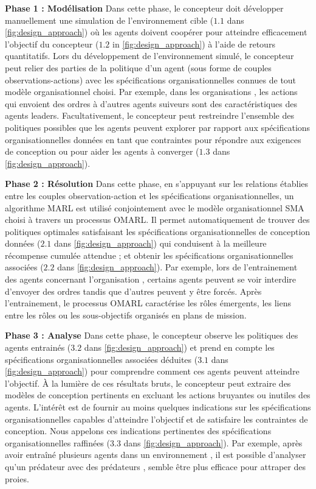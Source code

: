 \documentclass[contribution]{jfsma}
\newcounter{relation}
\begin{document}
\textbf{Phase 1 : Modélisation} \quad Dans cette phase, le concepteur doit développer manuellement une simulation de l'environnement cible ($1.1$ dans \autoref{fig:design_approach}) où les agents doivent coopérer pour atteindre efficacement l'objectif du concepteur ($1.2 $ in \autoref{fig:design_approach}) à l'aide de retours quantitatifs. Lors du développement de l'environnement simulé, le concepteur peut relier des parties de la politique d'un agent (sous forme de couples observations-actions) avec les spécifications organisationnelles connues de tout modèle organisationnel choisi.
Par exemple, dans les organisations , les actions qui envoient des ordres à d'autres agents suiveurs sont des caractéristiques des agents leaders.
Facultativement, le concepteur peut restreindre l'ensemble des politiques possibles que les agents peuvent explorer par rapport aux spécifications organisationnelles données en tant que contraintes pour répondre aux exigences de conception ou pour aider les agents à converger ($1.3$ dans \autoref{fig:design_approach}).

\textbf{Phase 2 : Résolution} \quad Dans cette phase, en s'appuyant sur les relations établies entre les couples observation-action et les spécifications organisationnelles, un algorithme MARL est utilisé conjointement avec le modèle organisationnel SMA choisi à travers un processus OMARL. Il permet automatiquement de trouver des politiques optimales satisfaisant les spécifications organisationnelles de conception données ($2.1$ dans \autoref{fig:design_approach}) qui conduisent à la meilleure récompense cumulée attendue ; et obtenir les spécifications organisationnelles associées ($2.2$ dans \autoref{fig:design_approach}). Par exemple, lors de l'entrainement des agents concernant l'organisation , certains agents peuvent se voir interdire d'envoyer des ordres tandis que d'autres peuvent y être forcés. Après l'entrainement, le processus OMARL caractérise les rôles émergents, les liens entre les rôles ou les sous-objectifs organisés en plans de mission.

\textbf{Phase 3 : Analyse} \quad Dans cette phase, le concepteur observe les politiques des agents entrainés ($3.2$ dans \autoref{fig:design_approach}) et prend en compte les spécifications organisationnelles associées déduites ($3.1$ dans \autoref{fig:design_approach}) pour comprendre comment ces agents peuvent atteindre l'objectif. À la lumière de ces résultats bruts, le concepteur peut extraire des modèles de conception pertinents en excluant les actions bruyantes ou inutiles des agents. L'intérêt est de fournir au moins quelques indications sur les spécifications organisationnelles capables d'atteindre l'objectif et de satisfaire les contraintes de conception. Nous appelons ces indications pertinentes des spécifications organisationnelles raffinées ($3.3$ dans \autoref{fig:design_approach}). Par exemple, après avoir entraîné plusieurs agents dans un environnement , il est possible d'analyser qu'un prédateur  avec des prédateurs , semble être plus efficace pour attraper des proies.
\end{document}
